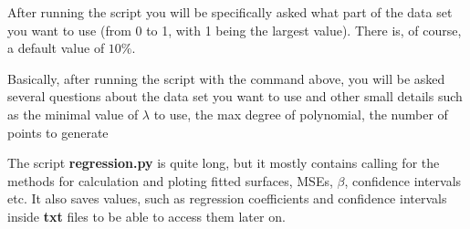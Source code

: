 After running the script you will be specifically asked what part of the data set you want to use (from 0 to 1, with 1 being the largest value). There is, of course, a default value of $10\%$.

Basically, after running the script with the command above, you will be asked several questions about the data set you want to use and other small details such as the minimal value of $\lambda$ to use, the max degree of polynomial, the number of points to generate

The script \textbf{regression.py} is quite long, but it mostly contains calling for the methods for calculation and ploting fitted surfaces, MSEs, $\beta$, confidence intervals etc. It also saves values, such as regression coefficients and confidence intervals inside \textbf{txt} files to be able to access them later on.





